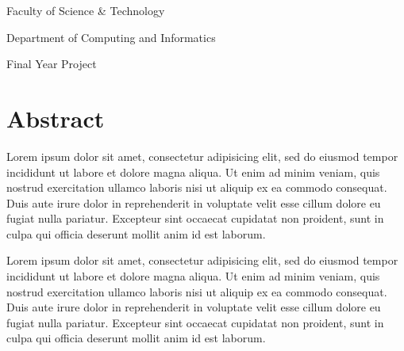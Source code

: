 \documentclass[11pt, twoside]{report}
\begin{document}

\vspace*{\fill}
\begingroup
\centering
Faculty of Science \& Technology

Department of Computing and Informatics

Final Year Project

\endgroup
\vspace*{\fill}

\chapter*{Abstract}
Lorem ipsum dolor sit amet, consectetur adipisicing elit, sed do eiusmod
tempor incididunt ut labore et dolore magna aliqua. Ut enim ad minim veniam,
quis nostrud exercitation ullamco laboris nisi ut aliquip ex ea commodo
consequat. Duis aute irure dolor in reprehenderit in voluptate velit esse
cillum dolore eu fugiat nulla pariatur. Excepteur sint occaecat cupidatat non proident, sunt in culpa qui officia deserunt mollit anim id est laborum.

Lorem ipsum dolor sit amet, consectetur adipisicing elit, sed do eiusmod
tempor incididunt ut labore et dolore magna aliqua. Ut enim ad minim veniam,
quis nostrud exercitation ullamco laboris nisi ut aliquip ex ea commodo
consequat. Duis aute irure dolor in reprehenderit in voluptate velit esse
cillum dolore eu fugiat nulla pariatur. Excepteur sint occaecat cupidatat non proident, sunt in culpa qui officia deserunt mollit anim id est laborum.
\end{document}
